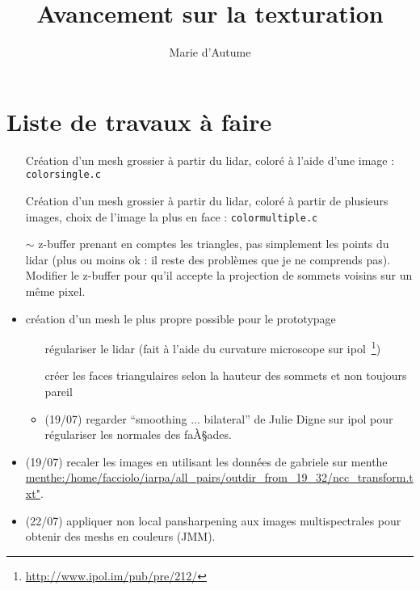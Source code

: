 \documentclass{article}
\title{Avancement sur la texturation}
\author{Marie d'Autume}
\begin{document}
\maketitle

\section{Liste de travaux à faire}
\label{sec:todolist}

\begin{itemize}
\item[\checkmark] Création d'un mesh grossier à partir du lidar, coloré à l'aide d'une image : \verb"colorsingle.c"
\item[\checkmark] Création d'un mesh grossier à partir du lidar, coloré à partir de plusieurs images, choix de l'image la plus en face : \verb"colormultiple.c"
\item[$\sim$] z-buffer prenant en comptes les triangles, pas simplement les points du lidar (plus ou moins ok : il reste des probl\`emes que je ne comprends pas). Modifier le z-buffer pour qu'il accepte la projection de sommets voisins sur un même pixel.
\item création d'un mesh le plus propre possible pour le prototypage
\begin{itemize}
\item[\checkmark] régulariser le lidar (fait à l'aide du curvature microscope
sur ipol~\footnote{\url{http://www.ipol.im/pub/pre/212/}})
\item[\checkmark]  créer les faces triangulaires selon la hauteur des sommets et
	non toujours pareil
\item (19/07) regarder ``smoothing ... bilateral'' de Julie Digne sur ipol pour
régulariser les normales des faÀ§ades.
\end{itemize}
\item (19/07) recaler les images en utilisant les données de gabriele sur menthe \url{menthe:/home/facciolo/iarpa/all_pairs/outdir_from_19_32/ncc_transform.txt"}. %
	\item (22/07) appliquer non local pansharpening aux images multispectrales pour obtenir des meshs en couleurs (JMM).


\end{itemize}
\end{document}
